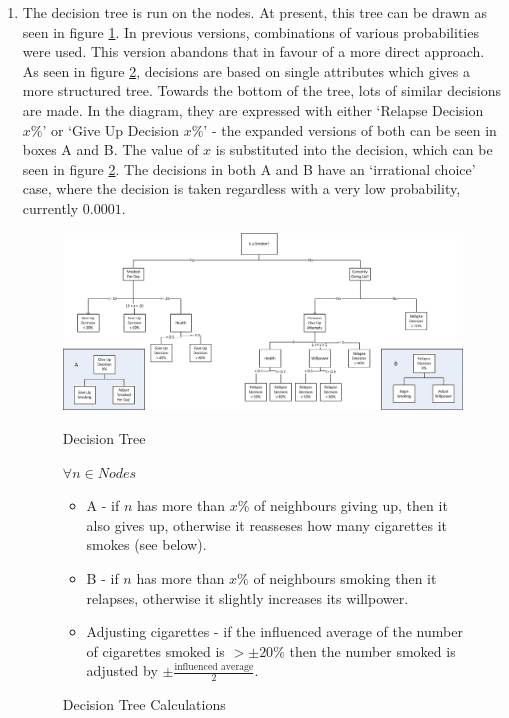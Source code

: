 \documentclass[]{article}
\begin{document}
\begin{enumerate}
\item The decision tree is run on the nodes. At present, this tree can be drawn as seen in figure \ref{dectree}. In previous versions, combinations of various probabilities were used. This version abandons that in favour of a more direct approach. As seen in figure \ref{decTreeProbs}, decisions are based on single attributes which gives a more structured tree. Towards the bottom of the tree, lots of similar decisions are made. In the diagram, they are expressed with either `Relapse Decision $x\%$' or `Give Up Decision $x\%$' - the expanded versions of both can be seen in boxes A and B. The value of $x$ is substituted into the decision, which can be seen in figure \ref{decTreeProbs}. The decisions in both A and B have an `irrational choice' case, where the decision is taken regardless with a very low probability, currently $0.0001$.
\begin{landscape}
\begin{figure}
\begin{center}
\includegraphics[width=\paperwidth,keepaspectratio]{DecTreev09.png}
\label{dectree}
\caption{Decision Tree}
\end{center}
\end{figure}
\end{landscape}

\begin{figure}
	$\forall n \in Nodes$

	\begin{itemize}
		\item A - if $n$ has more than $x\%$ of neighbours giving up, then it also gives up, otherwise it reasseses how many cigarettes it smokes (see below).
		\item B - if $n$ has more than $x\%$ of neighbours smoking then it relapses, otherwise it slightly increases its willpower.
		\item Adjusting cigarettes - if the influenced average of the number of cigarettes smoked is $>\pm20\%$ then the number smoked is adjusted by $\pm\frac{\text{influenced average}}{2}$.
	\end{itemize}
	\label{decTreeProbs}
	\caption{Decision Tree Calculations}
\end{figure}


\end{enumerate}
\end{document}
